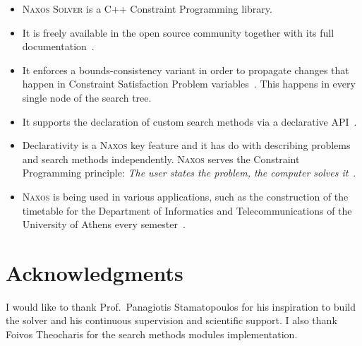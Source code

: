 \documentclass[a4paper]{article}
\begin{document}
\title{}

\author{Nikolaos Pothitos}


\date{}

\maketitle

\begin{itemize}
  \item \textsc{Naxos Solver} is a C++ Constraint
        Programming library.
  \item It is freely available in the open source community
        together with its full documentation~\cite{Naxos}.
  \item It enforces a bounds-consistency variant in order to
        propagate changes that happen in Constraint
        Satisfaction Problem variables~\cite{Bessiere2006}.
        This happens in every single node of the search
        tree.
  \item It supports the declaration of custom search methods
        via a declarative API~\cite{Pothitos2017}.
  \item Declarativity is a \textsc{Naxos} key feature and it
        has do with describing problems and search methods
        independently. \textsc{Naxos} serves the Constraint
        Programming principle: \emph{The user states the
        problem, the computer solves it}~\cite{Freuder2014}.
  \item \textsc{Naxos} is being used in various
        applications, such as the construction of the
        timetable for the Department of Informatics and
        Telecommunications of the University of Athens every
        semester~\cite{Pothitos2012-Scheduling}.
\end{itemize}

\section*{Acknowledgments}

I would like to thank Prof.~Panagiotis Stamatopoulos for his
inspiration to build the solver and his continuous
supervision and scientific support. I also thank Foivos
Theocharis for the search methods modules implementation.



\end{document}
